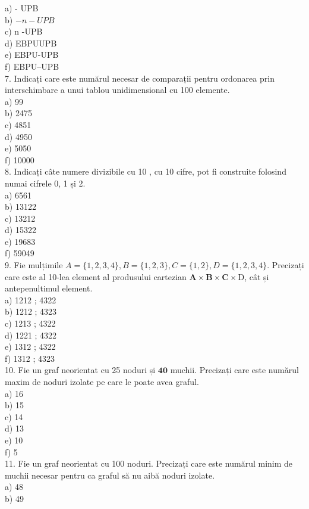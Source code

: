 a) - UPB\\
b) $-n-U P B$\\
c) n -UPB\\
d) EBPUUPB\\
e) EBPU-UPB\\
f) EBPU--UPB\\
7. Indicați care este numărul necesar de comparații pentru ordonarea prin interschimbare a unui tablou unidimensional cu 100 elemente.\\
a) 99\\
b) 2475\\
c) 4851\\
d) 4950\\
e) 5050\\
f) 10000\\
8. Indicați câte numere divizibile cu 10 , cu 10 cifre, pot fi construite folosind numai cifrele 0, 1 și 2.\\
a) 6561\\
b) 13122\\
c) 13212\\
d) 15322\\
e) 19683\\
f) 59049\\
9. Fie mulțimile $A=\{1,2,3,4\}, B=\{1,2,3\}, C=\{1,2\}, D=\{1,2,3,4\}$. Precizați care este al 10-lea element al produsului cartezian $\mathbf{A} \times \mathbf{B} \times \mathbf{C} \times \mathrm{D}$, cât și antepenultimul element.\\
a) 1212 ; 4322\\
b) 1212 ; 4323\\
c) 1213 ; 4322\\
d) 1221 ; 4322\\
e) 1312 ; 4322\\
f) 1312 ; 4323\\
10. Fie un graf neorientat cu 25 noduri și $\mathbf{4 0}$ muchii. Precizați care este numărul maxim de noduri izolate pe care le poate avea graful.\\
a) 16\\
b) 15\\
c) 14\\
d) 13\\
e) 10\\
f) 5\\
11. Fie un graf neorientat cu 100 noduri. Precizați care este numărul minim de muchii necesar pentru ca graful să nu aibă noduri izolate.\\
a) 48\\
b) 49\\
